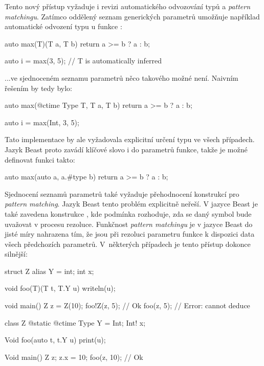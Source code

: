 Tento nový přístup vyžaduje i revizi automatického odvozování typů a \textit{pattern matchingu}. Zatímco oddělený seznam generických parametrů umožňuje například automatické odvození typu u funkce :

\begin{dcode}
auto max(T)(T a, T b) {
	return a >= b ? a : b;
}

auto i = max(3, 5); // T is automatically inferred
\end{dcode}

...ve sjednoceném seznamu parametrů něco takového možné není. Naivním řešením by tedy bylo:

\begin{code}
auto max(@ctime Type T, T a, T b) {
	return a >= b ? a : b;
}

auto i = max(Int, 3, 5);
\end{code}

Tato implementace by ale vyžadovala explicitní určení typu ve všech případech. Jazyk Beast proto zavádí klíčové slovo  i do parametrů funkce, takže je možné definovat funkci  takto:

\begin{code}
auto max(auto a, a.#type b) {
	return a >= b ? a : b;
}
\end{code}

Sjednocení seznamů parametrů také vyžaduje přehodnocení konstrukcí pro \textit{pattern matching}. Jazyk Beast tento problém explicitně neřeší. V jazyce Beast je také zavedena konstrukce , kde podmínka  rozhoduje, zda se daný symbol bude uvažovat v procesu rezoluce. Funkčnost \textit{pattern matchingu} je v jazyce Beast do jisté míry nahrazena tím, že jsou při rezoluci parametru funkce k dispozici data všech předchozích parametrů. V~některých případech je tento přístup dokonce silnější:

\begin{dcode}
struct Z {
	alias Y = int;
	int x;
}

void foo(T)(T t, T.Y u) {
	writeln(u);
}

void main() {
	Z z = Z(10);
	foo!Z(z, 5); // Ok
	foo(z, 5); // Error: cannot deduce
}
\end{dcode}

\begin{code}
class Z {
	@static @ctime Type Y = Int;
	Int! x;
}

Void foo(auto t, t.Y u) {
	print(u);
}

Void main() {
	Z z;
	z.x = 10;
	foo(z, 10); // Ok
}
\end{code}


